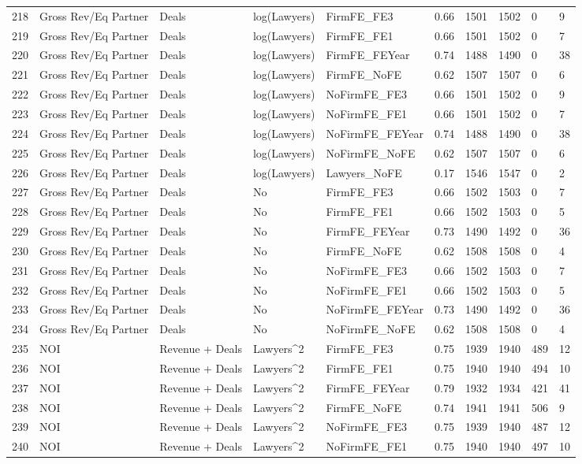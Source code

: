 \documentclass{article}
\begin{document}
\begin{table}[H]
\begin{tabular}{rlllllllll}
  218 & Gross Rev/Eq Partner & Deals & log(Lawyers) & FirmFE\_FE3 & 0.66 & 1501 & 1502 & 0 & 9 \\ 
  219 & Gross Rev/Eq Partner & Deals & log(Lawyers) & FirmFE\_FE1 & 0.66 & 1501 & 1502 & 0 & 7 \\ 
  220 & Gross Rev/Eq Partner & Deals & log(Lawyers) & FirmFE\_FEYear & 0.74 & 1488 & 1490 & 0 & 38 \\ 
  221 & Gross Rev/Eq Partner & Deals & log(Lawyers) & FirmFE\_NoFE & 0.62 & 1507 & 1507 & 0 & 6 \\ 
  222 & Gross Rev/Eq Partner & Deals & log(Lawyers) & NoFirmFE\_FE3 & 0.66 & 1501 & 1502 & 0 & 9 \\ 
  223 & Gross Rev/Eq Partner & Deals & log(Lawyers) & NoFirmFE\_FE1 & 0.66 & 1501 & 1502 & 0 & 7 \\ 
  224 & Gross Rev/Eq Partner & Deals & log(Lawyers) & NoFirmFE\_FEYear & 0.74 & 1488 & 1490 & 0 & 38 \\ 
  225 & Gross Rev/Eq Partner & Deals & log(Lawyers) & NoFirmFE\_NoFE & 0.62 & 1507 & 1507 & 0 & 6 \\ 
  226 & Gross Rev/Eq Partner & Deals & log(Lawyers) & Lawyers\_NoFE & 0.17 & 1546 & 1547 & 0 & 2 \\ 
  227 & Gross Rev/Eq Partner & Deals & No & FirmFE\_FE3 & 0.66 & 1502 & 1503 & 0 & 7 \\ 
  228 & Gross Rev/Eq Partner & Deals & No & FirmFE\_FE1 & 0.66 & 1502 & 1503 & 0 & 5 \\ 
  229 & Gross Rev/Eq Partner & Deals & No & FirmFE\_FEYear & 0.73 & 1490 & 1492 & 0 & 36 \\ 
  230 & Gross Rev/Eq Partner & Deals & No & FirmFE\_NoFE & 0.62 & 1508 & 1508 & 0 & 4 \\ 
  231 & Gross Rev/Eq Partner & Deals & No & NoFirmFE\_FE3 & 0.66 & 1502 & 1503 & 0 & 7 \\ 
  232 & Gross Rev/Eq Partner & Deals & No & NoFirmFE\_FE1 & 0.66 & 1502 & 1503 & 0 & 5 \\ 
  233 & Gross Rev/Eq Partner & Deals & No & NoFirmFE\_FEYear & 0.73 & 1490 & 1492 & 0 & 36 \\ 
  234 & Gross Rev/Eq Partner & Deals & No & NoFirmFE\_NoFE & 0.62 & 1508 & 1508 & 0 & 4 \\ 
  235 & NOI & Revenue + Deals & Lawyers^2 & FirmFE\_FE3 & 0.75 & 1939 & 1940 & 489 & 12 \\ 
  236 & NOI & Revenue + Deals & Lawyers^2 & FirmFE\_FE1 & 0.75 & 1940 & 1940 & 494 & 10 \\ 
  237 & NOI & Revenue + Deals & Lawyers^2 & FirmFE\_FEYear & 0.79 & 1932 & 1934 & 421 & 41 \\ 
  238 & NOI & Revenue + Deals & Lawyers^2 & FirmFE\_NoFE & 0.74 & 1941 & 1941 & 506 & 9 \\ 
  239 & NOI & Revenue + Deals & Lawyers^2 & NoFirmFE\_FE3 & 0.75 & 1939 & 1940 & 487 & 12 \\ 
  240 & NOI & Revenue + Deals & Lawyers^2 & NoFirmFE\_FE1 & 0.75 & 1940 & 1940 & 497 & 10 \\ 
   \hline
\end{tabular}
\end{table}
\end{document}
